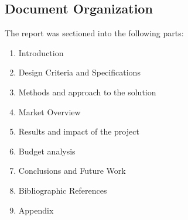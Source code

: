 \subsection{Document Organization}
The report was sectioned into the following parts:
\begin{enumerate}
	\item Introduction
	\item Design Criteria and Specifications
	\item Methods and approach to the solution
	\item Market Overview
	\item Results and impact of the project
	\item Budget analysis
	\item Conclusions and Future Work
	\item Bibliographic References
	\item Appendix
\end{enumerate}